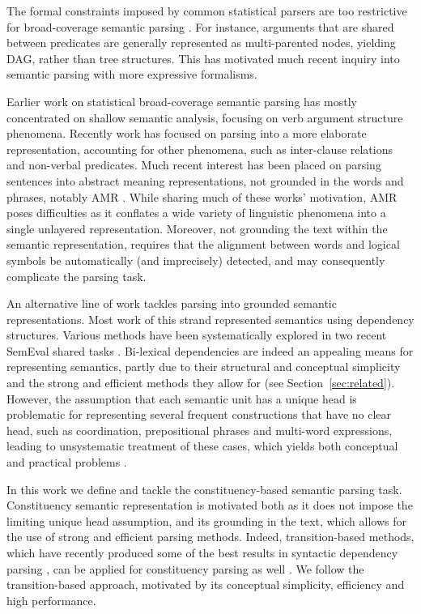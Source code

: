 \documentclass[11pt]{article}
\newcommand{\secref}[1]{Section~\ref{#1}}
\begin{document}
The formal constraints imposed by common statistical parsers are
too restrictive for broad-coverage semantic parsing \cite{oepen2015semeval}.
For instance, arguments that are shared
between predicates are generally represented as multi-parented nodes,
yielding DAG, rather than tree structures. This has motivated much recent
inquiry into semantic parsing with more expressive formalisms.

Earlier work on statistical broad-coverage semantic parsing has mostly
concentrated on shallow semantic analysis, focusing on verb argument structure phenomena.
Recently work has focused on parsing into a more elaborate representation, accounting
for other phenomena, such as inter-clause relations and non-verbal predicates.
Much recent interest has been placed on parsing sentences into abstract meaning representations,
not grounded in the words and phrases, notably AMR \cite{banarescu2013abstract}.
While sharing much of these works' motivation, AMR poses difficulties as it conflates
a wide variety of linguistic phenomena into a single unlayered representation.
Moreover, not grounding the text within the semantic representation,
requires that the alignment between words and logical symbols be automatically
(and imprecisely) detected, and may consequently complicate the parsing task.

An alternative line of work tackles parsing into grounded semantic representations.
Most work of this strand represented semantics using dependency structures.
Various methods have been systematically explored
in two recent SemEval shared tasks \cite{oepen2014semeval,oepen2015semeval}.
Bi-lexical dependencies are indeed an appealing means for representing semantics, partly due to
their structural and conceptual simplicity and the strong and efficient
methods they allow for (see \secref{sec:related}).
However, the assumption that each semantic unit has a unique head is
problematic for representing several frequent constructions that have no clear
head, such as coordination, prepositional phrases and multi-word expressions,
leading to unsystematic treatment of these cases, which yields both conceptual
and practical problems \cite{schwartz2011neutralizing,Ivanova2012who,tsarfaty2012cross}.

In this work we define and tackle the constituency-based semantic parsing task.
Constituency semantic representation is motivated both as it does not
impose the limiting unique head assumption, and its grounding in the text,
which allows for the use of strong and efficient parsing methods.
Indeed, transition-based methods, which have recently produced some of the best
results in syntactic dependency parsing \cite{dyer2015transition,ballesteros2015improved},
can be applied
for constituency parsing as well \cite{sagae2005classifier,zhu2013fast,maier2015discontinuous}. 
We follow the transition-based approach, motivated by its conceptual simplicity,
efficiency and high performance.
\end{document}
